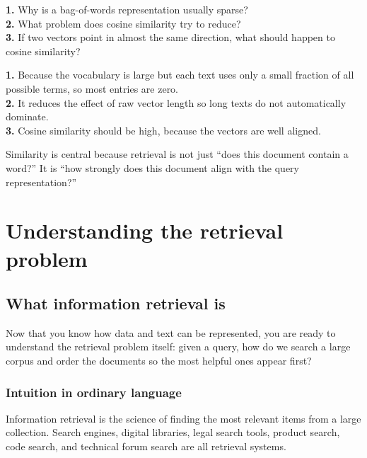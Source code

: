 \documentclass[11pt,oneside]{report}
\begin{document}
\begin{selfcheckbox}
\textbf{1.} Why is a bag-of-words representation usually sparse?\\
\textbf{2.} What problem does cosine similarity try to reduce?\\
\textbf{3.} If two vectors point in almost the same direction, what should happen to cosine similarity?
\end{selfcheckbox}

\begin{answerbox}
\textbf{1.} Because the vocabulary is large but each text uses only a small fraction of all possible terms, so most entries are zero.\\
\textbf{2.} It reduces the effect of raw vector length so long texts do not automatically dominate.\\
\textbf{3.} Cosine similarity should be high, because the vectors are well aligned.
\end{answerbox}

\begin{rememberbox}
Similarity is central because retrieval is not just ``does this document contain a word?'' It is ``how strongly does this document align with the query representation?''
\end{rememberbox}


\part[The Retrieval Problem]{Understanding the retrieval problem}
\chapter[What Retrieval Is]{What information retrieval is}

\begin{purposebox}
Now that you know how data and text can be represented, you are ready to understand the retrieval problem itself: given a query, how do we search a large corpus and order the documents so the most helpful ones appear first?
\end{purposebox}

\section*{Intuition in ordinary language}
Information retrieval is the science of finding the most relevant items from a large collection. Search engines, digital libraries, legal search tools, product search, code search, and technical forum search are all retrieval systems.
\end{document}
